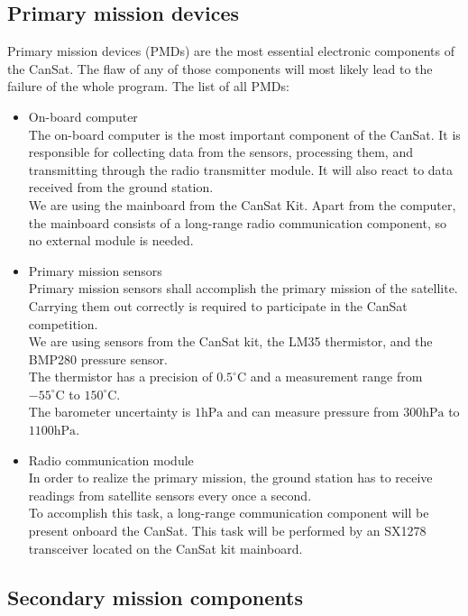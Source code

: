 \documentclass[class=report, crop=false]{standalone}
\begin{document}
\subsection*{Primary mission devices}
Primary mission devices (PMDs) are the most essential electronic components of the CanSat. The flaw of any of those components will most likely lead to the failure of the whole program.
The list of all PMDs:
\begin{itemize}
\item On-board computer \\
  The on-board computer is the most important component of the CanSat. It is responsible for collecting data from the sensors, processing them, and transmitting through the radio transmitter module.
  It will also react to data received from the ground station. \\
  We are using the mainboard from the CanSat Kit. Apart from the computer, the mainboard consists of a long-range radio communication component, so no external module is needed.
\item Primary mission sensors \\
  Primary mission sensors shall accomplish the primary mission of the satellite. 
  Carrying them out correctly is required to participate in the CanSat competition. \\
  We are using sensors from the CanSat kit, the LM35 thermistor, and the BMP280 pressure sensor. \\
  The thermistor has a precision of $0.5^{\circ} \text{C}$ and a measurement range from $-55^{\circ} \text{C}$ to $150^{\circ} \text{C}$. \\
  The barometer uncertainty is $1\text{hPa}$ and can measure pressure from $300\text{hPa}$ to $1100\text{hPa}$. 

\item Radio communication module \\
  In order to realize the primary mission, the ground station has to receive readings from satellite sensors every once a second. \\
  To accomplish this task, a long-range communication component will be present onboard the CanSat.
  This task will be performed by an SX1278 transceiver located on the CanSat kit mainboard.
\end{itemize}
\subsection*{Secondary mission components} 
\end{document}
